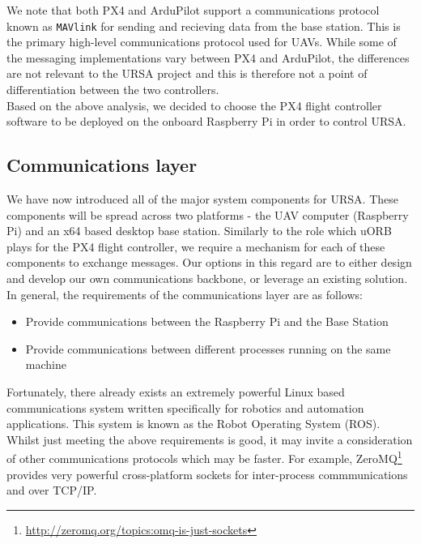 \documentclass[capstone_report.tex]{subfiles}
\begin{document}
We note that both PX4 and ArduPilot support a communications protocol known as \texttt{MAVlink} for sending and recieving data from the base station. This is the primary high-level communications protocol used for UAVs. While some of the messaging implementations vary between PX4 and ArduPilot, the differences are not relevant to the URSA project and this is therefore not a point of differentiation between the two controllers. \\

Based on the above analysis, we decided to choose the PX4 flight controller software to be deployed on the onboard Raspberry Pi in order to control URSA.

\subsection{Communications layer}
We have now introduced all of the major system components for URSA. These components will be spread across two platforms - the UAV computer (Raspberry Pi) and an x64 based desktop base station. Similarly to the role which uORB plays for the PX4 flight controller, we require a mechanism for each of these components to exchange messages. Our options in this regard are to either design and develop our own communications backbone, or leverage an existing solution. In general, the requirements of the communications layer are as follows:

\begin{itemize}
	\item Provide communications between the Raspberry Pi and the Base Station
	\item Provide communications between different processes running on the same machine 
\end{itemize}

Fortunately, there already exists an extremely powerful Linux based communications system written specifically for robotics and automation applications. This system is known as the Robot Operating System (ROS). Whilst just meeting the above requirements is good, it may invite a consideration of other communications protocols which may be faster. For example, ZeroMQ\footnote{\url{http://zeromq.org/topics:omq-is-just-sockets}} provides very powerful cross-platform sockets for inter-process commmunications and over TCP/IP. \\
\end{document}
